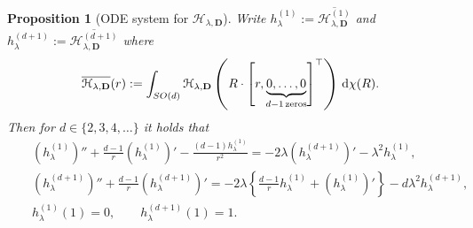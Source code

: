 \documentclass[11pt,a4paper,english,reqno]{amsart}
\theoremstyle{plain}
\newtheorem{proposition}[definition]{Proposition}
\newcommand{\dd}{{\rm d}}
\newcommand{\1}{\mathbbm{1}}
\begin{document}
\begin{proposition}[ODE system for $\mathcal{H}_{\lambda, \mathbf{D}}$]\label{propn: ODE for hyperbolic dev in d-dim}
Write $h_{\lambda}^{(1)}:=\overline{\mathcal{H}^{(1)}_{\lambda, \mathbf{D}}}$ and $h_{\lambda}^{(d+1)}:=\overline{\mathcal{H}^{(d+1)}_{\lambda, \mathbf{D}}}$ where 
\begin{equation*}
    \overline{\mathcal{H}_{\lambda, \mathbf{D}}}(r) := \int_{SO(d)} \mathcal{H}_{\lambda, \mathbf{D}}\left(R\cdot\left[r,\underbrace{0,\ldots,0}_{d-1\,\text{zeros}}\right]^\top\right) \,\dd\chi(R).
\end{equation*}
Then for $d\in \{2,3,4,\ldots\}$ it holds that
  \begin{eqnarray}
    &&\left(h^{(1)}_{\lambda} \right)'' + \frac{d-1}{r} \left(h^{(1)}_{\lambda}\right)'- \frac{(d-1) h^{(1)}_{\lambda}}{r^2} = -2\lambda \left(h^{(d+1)}_{\lambda}\right)' - \lambda^{2}h^{(1)}_{\lambda},\label{ODE one, d-dim}\\
    && \left(h^{(d+1)}_{\lambda}\right)'' +\frac{d-1}{r}\left(h^{(d+1)}_{\lambda}\right)' = - 2 \lambda \left\{\frac{d-1}{r}h^{(1)}_{\lambda} +\left(h^{(1)}_{\lambda}\right)'\right\} -  d \lambda^{2}h^{(d+1)}_{\lambda},\label{ODE two, d-dim}\\
    && h^{(1)}_\lambda (1) = 0,\qquad h^{(d+1)}_\lambda(1)=1.
    \end{eqnarray}
\end{proposition}
\end{document}
